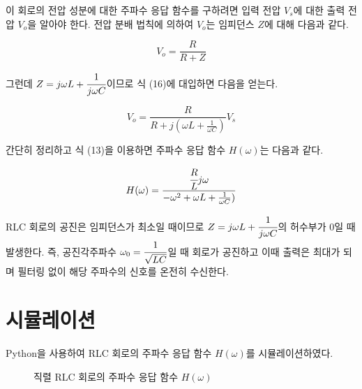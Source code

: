 \documentclass{article}
\begin{document}
이 회로의 전압 성분에 대한 주파수 응답 함수를 구하려면 입력 전압 $V_s$에 대한 출력 전압 $V_o$을 알아야 한다. 전압 분배 법칙에 의하여 $V_o$는 임피던스 $Z$에 대해 다음과 같다.

\begin{equation}
    V_o=\frac{R}{R+Z}
\end{equation}

그런데 $Z=j\omega L+\cfrac{1}{j\omega C}$이므로 식 (16)에 대입하면 다음을 얻는다.

\begin{equation}
    V_o=\frac{R}{R+j(\omega L+\frac{1}{\omega C})}V_s
\end{equation}

간단히 정리하고 식 (13)을 이용하면 주파수 응답 함수 $H(\omega)$는 다음과 같다.

\begin{equation}
    H(\omega)=\frac{\cfrac{R}{L}j\omega}{-\omega^2+\omega L+\frac{1}{\omega C})}
\end{equation}

RLC 회로의 공진은 임피던스가 최소일 때이므로 $Z=j\omega L+\cfrac{1}{j\omega C}$의 허수부가 0일 때 발생한다. 즉, 공진각주파수 $\omega_0=\cfrac{1}{\sqrt{LC}}$일 때 회로가 공진하고 이때 출력은 최대가 되며 필터링 없이 해당 주파수의 신호를 온전히 수신한다.

\section{시뮬레이션}
Python을 사용하여 RLC 회로의 주파수 응답 함수 $H(\omega)$를 시뮬레이션하였다.

\begin{figure}[h]
    \centering
    \caption{직렬 RLC 회로의 주파수 응답 함수 $H(\omega)$}
\end{figure}
\end{document}
